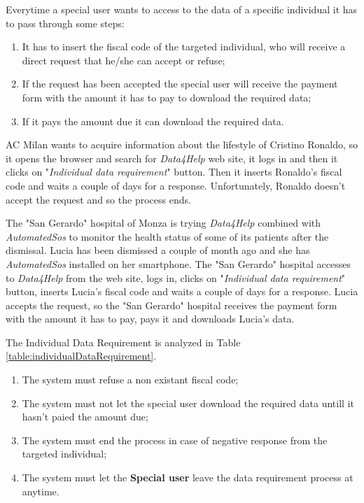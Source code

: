 Everytime a special user wants to access to the data of a specific individual it has to pass through some steps:
\begin{enumerate}
  \item It has to insert the fiscal code of the targeted individual, who will receive a direct request that he/she can accept or refuse;
  \item If the request has been accepted the special user will receive the payment form with the amount it has to pay to download the required data;
  \item If it pays the amount due it can download the required data.
\end{enumerate}

AC Milan wants to acquire information about the lifestyle of Cristino Ronaldo, so it opens the browser and search for \textit{Data4Help} web site, it logs in and then it clicks on "\textit{Individual data requirement}" button. Then it inserts Ronaldo's fiscal code and waits a couple of days for a response. Unfortunately, Ronaldo doesn't accept the request and so the process ends.

The "San Gerardo" hospital of Monza is trying \textit{Data4Help} combined with \textit{AutomatedSos} to monitor the health status of some of its patients after the dismissal. Lucia has been dismissed a couple of month ago and she has \textit{AutomatedSos} installed on her smartphone. The "San Gerardo" hospital accesses to \textit{Data4Help} from the web site, logs in, clicks on "\textit{Individual data requirement}" button, inserts Lucia's fiscal code and waits a couple of days for a response. Lucia accepts the request, so the "San Gerardo" hospital receives the payment form with the amount it has to pay, pays it and downloads Lucia's data.

The Individual Data Requirement is analyzed in Table \ref{table:individualDataRequirement}.

\begin{enumerate}
  \item The system must refuse a non existant fiscal code;
  \item The system must not let the special user download the required data untill it hasn't paied the amount due;
  \item The system must end the process in case of negative response from the targeted individual;
  \item The system must let the \textbf{Special user} leave the data requirement process at anytime.
\end{enumerate}

